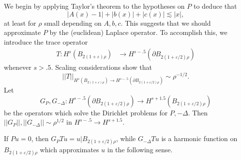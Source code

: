 \documentclass[reqno,12pt,letterpaper]{amsart}
\theoremstyle{definition}
\numberwithin{equation}{section}
\begin{document}
We begin by applying Taylor's theorem to the hypotheses on $P$ to deduce that
\begin{equation}\label{Taylor coefficients are small}
|A(x) - 1| + |b(x)| + |c(x)| \lesssim |x|,
\end{equation}
at least for $\rho$ small depending on $A, b, c$.
This suggests that we should approximate $P$ by the (euclidean) Laplace operator.
To accomplish this, we introduce the trace operator
\begin{align*}
T: H^s(B_{2(1 + \varepsilon)\rho}) &\to H^{s-.5}(\partial B_{2(1 + \varepsilon/2)\rho})
\end{align*}
whenever $s > .5$.
Scaling considerations show that
$$||T||_{H^s(B_{2(1 + \varepsilon)\rho}) \to H^{s - .5}(\partial B_{2(1 + \varepsilon/2)\rho})} \sim \rho^{-1/2}.$$
Let
$$G_P, G_{-\Delta}: H^{s - .5}(\partial B_{2(1 + \varepsilon/2)\rho}) \to H^{s + 1.5}(B_{2(1 + \varepsilon/2)\rho})$$
be the operators which solve the Dirichlet problems for $P,-\Delta$.
Then $||G_P||, ||G_{-\Delta}|| \sim \rho^{1/2}$ in $H^{s - .5} \to H^{s + 1.5}$.

If $Pu = 0$, then $G_PTu = u|B_{2(1 + \varepsilon/2)\rho}$, while $G_{-\Delta}Tu$ is a harmonic function on $B_{2(1 + \varepsilon/2)\rho}$ which approximates $u$ in the following sense.
\end{document}

